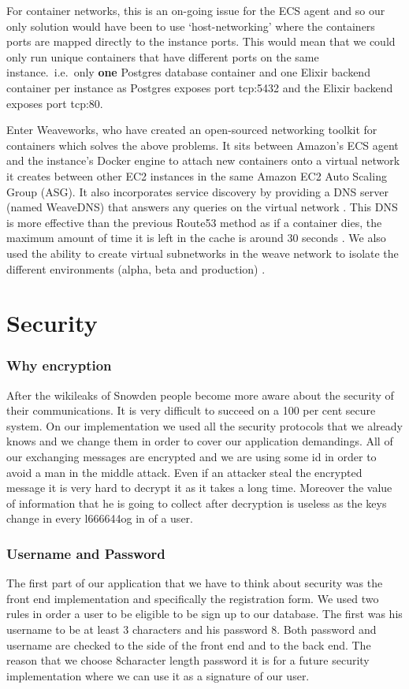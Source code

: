 \documentclass[11pt,a4paper]{report}
\begin{document}
For container networks, this is an on-going issue for the ECS agent \cite{website:github_user_network_issue} and so our only solution would have been to use `host-networking' where the containers ports are mapped directly to the instance ports. This would mean that we could only run unique containers that have different ports on the same instance.\ i.e.\ only \textbf{one} Postgres database container and one Elixir backend container per instance as Postgres exposes port tcp:5432 and the Elixir backend exposes port tcp:80.

Enter Weaveworks, who have created an open-sourced networking toolkit for containers which solves the above problems. It sits between Amazon's ECS agent and the instance's Docker engine to attach new containers onto a virtual network it creates between other EC2 instances in the same Amazon EC2 Auto Scaling Group (ASG). It also incorporates service discovery by providing a DNS server (named WeaveDNS) that answers any queries on the virtual network \cite{website:weave_dns}. This DNS is more effective than the previous Route53 method as if a container dies, the maximum amount of time it is left in the cache is around 30 seconds \cite{website:weave_dns_fault_tolerance}. We also used the ability to create virtual subnetworks in the weave network to isolate the different environments (alpha, beta and production) \cite{website:weave_subnet_allocation}.


\section{Security}

\subsubsection{Why encryption}
After the wikileaks of Snowden people become more aware about the security of their communications. It is very difficult to succeed on a 100 per cent secure system. On our implementation we used all the security protocols that we already knows and we change them in order to cover our application demandings. All of our exchanging messages are encrypted and we are using some id in order to avoid a man in the middle attack. Even if an attacker steal the encrypted message it is very hard to decrypt it as it takes a long time. Moreover the value of information that he is going to collect after decryption is useless as the keys change in every l666644og in of a user.

\subsubsection{Username and Password}
The first part of our application that we have to think about security was the front end implementation and specifically the registration form. We used two rules in order a user to be eligible to be sign up to our database. The first was his username to be at least 3 characters and his password 8. Both password and username are checked to the side of the front end and to the back end. The reason that we choose 8character length password it is for a future security implementation where we can use it as a signature of our user.
\end{document}
